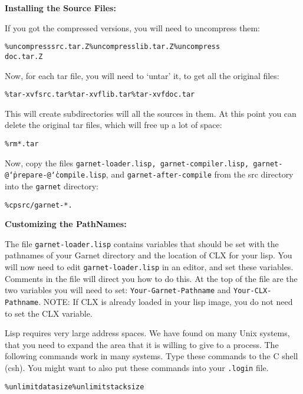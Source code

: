 \documentclass{report}
\newenvironment{programexample}{\begin{alltt}}{\end{alltt}}
\begin{document}
{\bf Installing the Source Files:}

If you got the compressed versions, you will need to uncompress them:
\begin{programexample}
  \% uncompress src.tar.Z \% uncompress lib.tar.Z \% uncompress
  doc.tar.Z
\end{programexample}

Now, for each tar file, you will need to `untar' it, to get all the
original files:
\begin{programexample}
  \% tar -xvf src.tar \% tar -xvf lib.tar \% tar -xvf doc.tar
\end{programexample}

This will create subdirectories will all the sources in them.  At this
point you can delete the original tar files, which will free up a lot
of space:
\begin{programexample}
  \% rm *.tar
\end{programexample}

Now, copy the files \texttt{garnet-loader.lisp, garnet-compiler.lisp,
  garnet-@{\tt\char`\|}prepare-@{\tt\char`\|}compile.lisp}, and
\texttt{garnet-after-compile} from the src directory into the \texttt{garnet}
directory:
\begin{programexample}
  \% cp src/garnet-* .
\end{programexample}


{\bf Customizing the PathNames:}

The file \texttt{garnet-loader.lisp} contains variables that should be set
with the pathnames of your Garnet directory and the location of CLX
for your lisp.  You will now need to edit \texttt{garnet-loader.lisp} in
an editor, and set these variables.  Comments in the file will direct
you how to do this.  At the top of the file are the two variables you
will need to set: \texttt{Your-Garnet-Pathname} and
\texttt{Your-CLX-Pathname}.  NOTE: If CLX is already loaded in your lisp
image, you do not need to set the CLX variable.



Lisp requires very large address spaces.  We have found on many Unix
systems, that you need to expand the area that it is willing to give
to a process.  The following commands work in many systems.  Type
these commands to the C shell (csh).  You might want to also put these
commands into your \texttt{.login} file.
\begin{programexample}
  \% unlimit datasize \% unlimit stacksize
\end{programexample}
\end{document}

